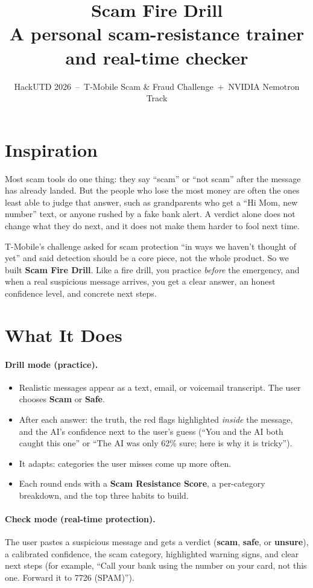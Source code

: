 \documentclass[11pt]{article}
\title{Scam Fire Drill\\[2pt]\large A personal scam-resistance trainer and real-time checker}
\author{HackUTD 2026 \,--\, T-Mobile Scam \& Fraud Challenge \,+\, NVIDIA Nemotron Track}
\date{}
\begin{document}
\maketitle

\section*{Inspiration}
Most scam tools do one thing: they say ``scam'' or ``not scam'' after the message has already landed. But the people who lose the most money are often the ones least able to judge that answer, such as grandparents who get a ``Hi Mom, new number'' text, or anyone rushed by a fake bank alert. A verdict alone does not change what they do next, and it does not make them harder to fool next time.

T-Mobile's challenge asked for scam protection ``in ways we haven't thought of yet'' and said detection should be a core piece, not the whole product. So we built \textbf{Scam Fire Drill}. Like a fire drill, you practice \emph{before} the emergency, and when a real suspicious message arrives, you get a clear answer, an honest confidence level, and concrete next steps.

\section*{What It Does}
\paragraph{Drill mode (practice).}
\begin{itemize}
  \item Realistic messages appear as a text, email, or voicemail transcript. The user chooses \textbf{Scam} or \textbf{Safe}.
  \item After each answer: the truth, the red flags highlighted \emph{inside} the message, and the AI's confidence next to the user's guess (``You and the AI both caught this one'' or ``The AI was only 62\% sure; here is why it is tricky'').
  \item It adapts: categories the user misses come up more often.
  \item Each round ends with a \textbf{Scam Resistance Score}, a per-category breakdown, and the top three habits to build.
\end{itemize}

\paragraph{Check mode (real-time protection).}
The user pastes a suspicious message and gets a verdict (\textbf{scam}, \textbf{safe}, or \textbf{unsure}), a calibrated confidence, the scam category, highlighted warning signs, and clear next steps (for example, ``Call your bank using the number on your card, not this one. Forward it to 7726 (SPAM)'').
\end{document}
